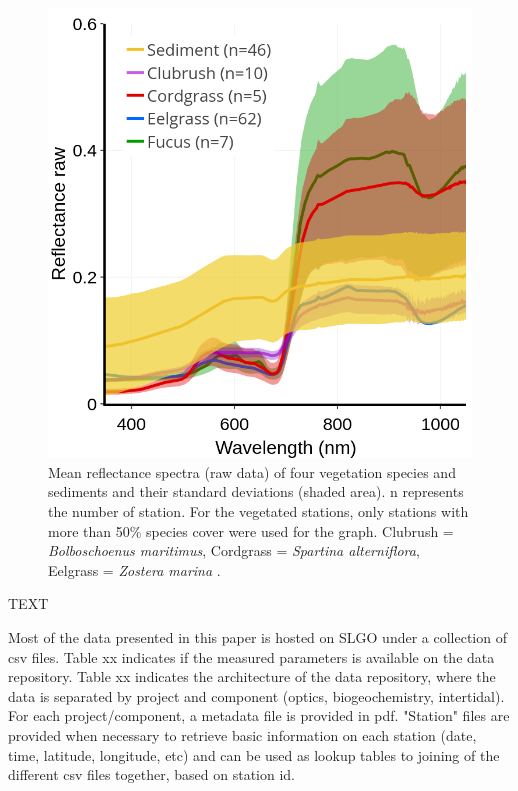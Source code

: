 \documentclass[essd, manuscript]{copernicus}
\begin{document}
\begin{figure}[t]
    \includegraphics[width=12cm]{Figures/ASD_intertidal.png}
    \caption{Mean reflectance spectra (raw data) of four vegetation species and sediments and their standard deviations (shaded area). n represents the number of station. For the vegetated stations, only stations with more than 50\% species cover were used for the graph. Clubrush = \textit{Bolboschoenus maritimus}, Cordgrass = \textit{Spartina alterniflora}, Eelgrass = \textit{Zostera marina }.}
    \label{fig:asdintertidal}
\end{figure}


\conclusions  %
TEXT




\dataavailability %
{Most of the data presented in this paper is hosted on SLGO under a collection of csv files. Table xx indicates if the measured parameters is available on the data repository. Table xx indicates the architecture of the data repository, where the data is separated by project and component (optics, biogeochemistry, intertidal). For each project/component, a metadata file is provided in pdf. "Station" files are provided when necessary to retrieve basic information on each station (date, time, latitude, longitude, etc) and can be used as lookup tables to joining of the different csv files together, based on station id. } 
\end{document}
